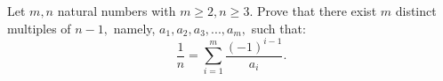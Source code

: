 Let $ m, n $ natural numbers with $ m\ge 2,n\ge 3. $ Prove that there exist $ m $ distinct multiples of $ n-1, $ namely, $ a_1,a_2,a_3,...,a_m, $ such that:
$$ \frac{1}{n} =\sum_{i=1}^m \frac{(-1)^{i-1}}{a_i} . $$